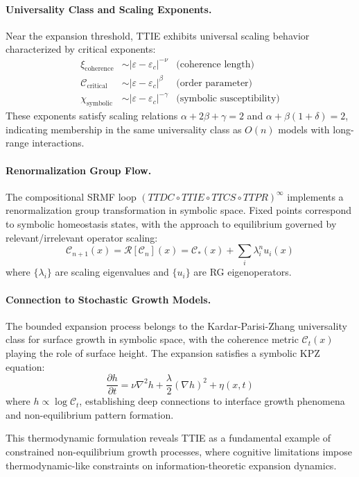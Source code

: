 \begin{demonstratio}
\paragraph{Universality Class and Scaling Exponents.}
Near the expansion threshold, TTIE exhibits universal scaling behavior characterized by critical exponents:
\begin{align}
\xi_{\text{coherence}} &\sim |\varepsilon - \varepsilon_c|^{-\nu} & \text{(coherence length)} \\
\mathcal{C}_{\text{critical}} &\sim |\varepsilon - \varepsilon_c|^{\beta} & \text{(order parameter)} \\
\chi_{\text{symbolic}} &\sim |\varepsilon - \varepsilon_c|^{-\gamma} & \text{(symbolic susceptibility)}
\end{align}
These exponents satisfy scaling relations $\alpha + 2\beta + \gamma = 2$ and $\alpha + \beta(1+\delta) = 2$, indicating membership in the same universality class as $O(n)$ models with long-range interactions.

\paragraph{Renormalization Group Flow.}
The compositional SRMF loop $(TTDC \circ TTIE \circ TTCS \circ TTPR)^{\infty}$ implements a renormalization group transformation in symbolic space. Fixed points correspond to symbolic homeostasis states, with the approach to equilibrium governed by relevant/irrelevant operator scaling:
\begin{equation}
\mathcal{C}_{n+1}(x) = \mathcal{R}[\mathcal{C}_n](x) = \mathcal{C}_*(x) + \sum_i \lambda_i^n u_i(x)
\end{equation}
where $\{\lambda_i\}$ are scaling eigenvalues and $\{u_i\}$ are RG eigenoperators.

\paragraph{Connection to Stochastic Growth Models.}
The bounded expansion process belongs to the Kardar-Parisi-Zhang universality class for surface growth in symbolic space, with the coherence metric $\mathcal{C}_t(x)$ playing the role of surface height. The expansion satisfies a symbolic KPZ equation:
\begin{equation}
\frac{\partial h}{\partial t} = \nu \nabla^2 h + \frac{\lambda}{2}(\nabla h)^2 + \eta(x,t)
\end{equation}
where $h \propto \log \mathcal{C}_t$, establishing deep connections to interface growth phenomena and non-equilibrium pattern formation.

This thermodynamic formulation reveals TTIE as a fundamental example of constrained non-equilibrium growth processes, where cognitive limitations impose thermodynamic-like constraints on information-theoretic expansion dynamics.
\end{demonstratio}

